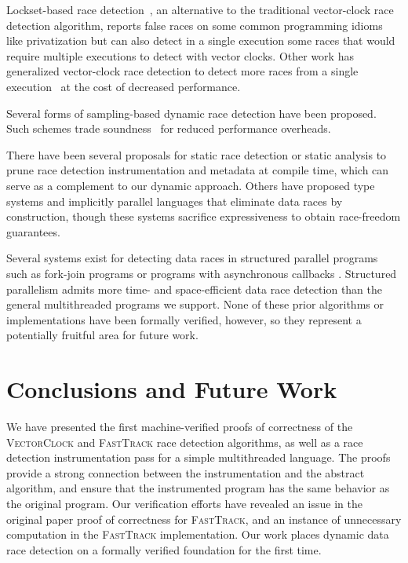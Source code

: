 \documentclass[preprint, 10pt]{sigplanconf}
\newcommand{\VCalg}{\textsc{VectorClock}\xspace}
\newcommand{\FT}{\textsc{FastTrack}\xspace}
\begin{document}
Lockset-based race detection~\cite{dinning_detecting_1991,savage_eraser:_1997}, an alternative to the traditional vector-clock race detection algorithm, reports false races on some common programming idioms like privatization but can also detect in a single execution some races that would require multiple executions to detect with vector clocks. Other work has generalized vector-clock race detection to detect more races from a single execution~\cite{smaragdakis_sound_2012,sen_detecting_2005,chen_parametric_2007} at the cost of decreased performance.

Several forms of sampling-based dynamic race detection have been proposed. Such schemes trade soundness~\cite{greathouse_demand-driven_2011,bond_pacer:_2010,marino_literace:_2009,erickson_effective_2010,effinger-dean_ifrit:_2012} for reduced performance overheads.

There have been several proposals for static race detection \cite{engler_racerx:_2003,naik_effective_2006} or static analysis \cite{flanagan_redcard:_2013,Das:2015:SPA:2775085.2766451} to prune race detection instrumentation and metadata at compile time, which can serve as a complement to our dynamic approach. Others have proposed type systems \cite{abadi_types_2006,bocchino_type_2009} and implicitly parallel languages \cite{rinard_design_1998,guy_blelloch_nesl:_1992} that eliminate data races by construction, though these systems sacrifice expressiveness to obtain race-freedom guarantees.

Several systems exist for detecting data races in structured parallel programs
such as fork-join programs
\cite{john_mellor-crummey_--fly_1991,Bender:2004:sporder:1007912.1007933,mai_zheng_grace:_2011,boyer2008automated,raman:spd3} or programs with asynchronous callbacks \cite{petrov_race_2012,raychev_effective_2013,hsiao_race_2014,Bielik:2015:SRD:2814270.2814303}. Structured parallelism admits more time- and space-efficient data race detection than the general multithreaded programs we support. None of these prior algorithms or implementations have been formally verified, however, so they represent a potentially fruitful area for future work.

\section{Conclusions and Future Work}
\label{conclusion}

We have presented the first machine-verified proofs of correctness of the \VCalg and \FT race detection algorithms, as well as a race detection instrumentation pass for a simple multithreaded language. The proofs provide a strong connection between the instrumentation and the abstract algorithm, and ensure that the instrumented program has the same behavior as the original program. Our verification efforts have revealed an issue in the original paper proof of correctness for \FT, and an instance of unnecessary computation in the \FT implementation. Our work places dynamic data race detection on a formally verified foundation for the first time.
\end{document}
